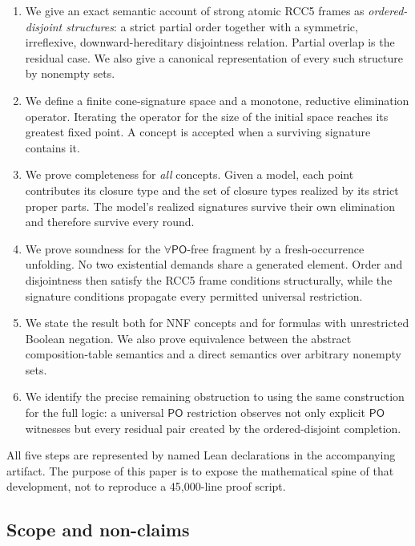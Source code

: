\documentclass[11pt]{article}
\theoremstyle{plain}
\theoremstyle{definition}
\theoremstyle{remark}
\newcommand{\PO}{\ensuremath{\mathsf{PO}}}
\begin{document}
\begin{enumerate}
  \item We give an exact semantic account of strong atomic RCC5 frames as
  \emph{ordered-disjoint structures}: a strict partial order together with a
  symmetric, irreflexive, downward-hereditary disjointness relation.  Partial
  overlap is the residual case.  We also give a canonical representation of
  every such structure by nonempty sets.

  \item We define a finite cone-signature space and a monotone, reductive
  elimination operator.  Iterating the operator for the size of the initial
  space reaches its greatest fixed point.  A concept is accepted when a
  surviving signature contains it.

  \item We prove completeness for \emph{all} concepts.  Given a model, each
  point contributes its closure type and the set of closure types realized by
  its strict proper parts.  The model's realized signatures survive their own
  elimination and therefore survive every round.

  \item We prove soundness for the $\forall\PO$-free fragment by a
  fresh-occurrence unfolding.  No two existential demands share a generated
  element.  Order and disjointness then satisfy the RCC5 frame conditions
  structurally, while the signature conditions propagate every permitted
  universal restriction.

  \item We state the result both for NNF concepts and for formulas with
  unrestricted Boolean negation.  We also prove equivalence between the
  abstract composition-table semantics and a direct semantics over arbitrary
  nonempty sets.

  \item We identify the precise remaining obstruction to using the same
  construction for the full logic: a universal $\PO$ restriction observes
  not only explicit $\PO$ witnesses but every residual pair created by the
  ordered-disjoint completion.
\end{enumerate}

All five steps are represented by named Lean declarations in the accompanying
artifact.  The purpose of this paper is to expose the mathematical spine of
that development, not to reproduce a 45,000-line proof script.

\subsection{Scope and non-claims}
\label{sec:scope}
\end{document}
